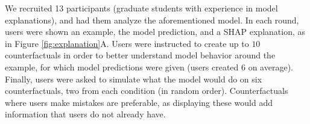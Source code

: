 We recruited 13 participants (graduate students with experience in model explanations), and had them analyze the aforementioned \qqp model. In each round, users were shown an example, the model prediction, and a SHAP explanation, as in Figure \ref{fig:explanation}A. Users were instructed to create up to $10$ counterfactuals in order to better understand model behavior around the example, for which model predictions were given (users created $6$ on average). 
Finally, users were asked to simulate what the model would do on six counterfactuals, two from each condition (in random order). Counterfactuals where users make mistakes are preferable, as displaying these would add information that users do not already have.



